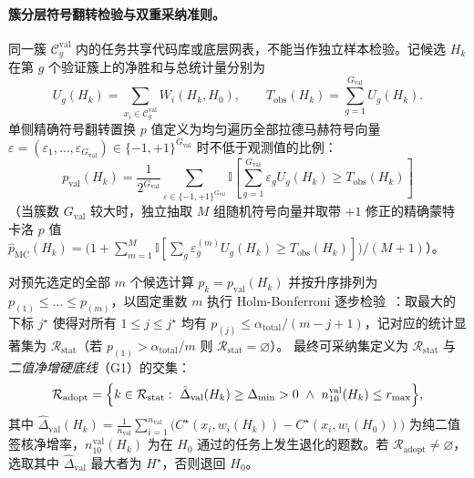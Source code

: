 \documentclass[UTF8,a4paper,10.5pt]{ctexart}
\newcommand{\Ind}{\mathbb{I}}
\begin{document}
\paragraph{簇分层符号翻转检验与双重采纳准则。}
同一簇 $\mathcal{C}^{\mathrm{val}}_g$ 内的任务共享代码库或底层网表，不能当作独立样本检验。记候选 $H_k$ 在第 $g$ 个验证簇上的净胜和与总统计量分别为
\begin{equation}
  U_g(H_k) = \sum_{x_i\in\mathcal{C}^{\mathrm{val}}_g} W_i(H_k, H_0), \qquad
  T_{\mathrm{obs}}(H_k) = \sum_{g=1}^{G_{\mathrm{val}}} U_g(H_k).
\end{equation}
单侧精确符号翻转置换 $p$ 值定义为均匀遍历全部拉德马赫符号向量 $\varepsilon=(\varepsilon_1,\dots,\varepsilon_{G_{\mathrm{val}}})\in\{-1,+1\}^{G_{\mathrm{val}}}$ 时不低于观测值的比例：
\begin{equation}
  p_{\mathrm{val}}(H_k) = \frac{1}{2^{G_{\mathrm{val}}}}
  \sum_{\varepsilon\in\{-1,+1\}^{G_{\mathrm{val}}}}
  \Ind\!\left[\sum_{g=1}^{G_{\mathrm{val}}} \varepsilon_g U_g(H_k) \ge T_{\mathrm{obs}}(H_k)\right]
  \label{eq:pval}
\end{equation}
（当簇数 $G_{\mathrm{val}}$ 较大时，独立抽取 $M$ 组随机符号向量并取带 $+1$ 修正的精确蒙特卡洛 $p$ 值 $\hat{p}_{\mathrm{MC}}(H_k)=\bigl(1+\sum_{m=1}^M\Ind[\sum_g\varepsilon^{(m)}_g U_g(H_k)\ge T_{\mathrm{obs}}(H_k)]\bigr)/(M+1)$）。

对预先选定的全部 $m$ 个候选计算 $p_k=p_{\mathrm{val}}(H_k)$ 并按升序排列为 $p_{(1)}\le\dots\le p_{(m)}$，以固定重数 $m$ 执行 Holm-Bonferroni 逐步检验~\cite{holm}：取最大的下标 $j^\star$ 使得对所有 $1\le j\le j^\star$ 均有 $p_{(j)}\le\alpha_{\mathrm{total}}/(m-j+1)$，记对应的统计显著集为 $\mathcal{R}_{\mathrm{stat}}$（若 $p_{(1)}>\alpha_{\mathrm{total}}/m$ 则 $\mathcal{R}_{\mathrm{stat}}=\varnothing$）。
最终可采纳集定义为 $\mathcal{R}_{\mathrm{stat}}$ 与\emph{二值净增硬底线}（G1）的交集：
\begin{equation}
  \mathcal{R}_{\mathrm{adopt}} = \Bigl\{k\in\mathcal{R}_{\mathrm{stat}} :\ 
  \hat{\Delta}_{\mathrm{val}}(H_k) \ge \Delta_{\min} > 0
  \ \land\ n_{10}^{\mathrm{val}}(H_k)\le r_{\max}\Bigr\},
  \label{eq:adopt}
\end{equation}
其中 $\hat{\Delta}_{\mathrm{val}}(H_k)=\frac{1}{n_{\mathrm{val}}}\sum_{i=1}^{n_{\mathrm{val}}}\bigl(C^\star(x_i,w_i(H_k))-C^\star(x_i,w_i(H_0))\bigr)$ 为纯二值签核净增率，$n_{10}^{\mathrm{val}}(H_k)$ 为在 $H_0$ 通过的任务上发生退化的题数。若 $\mathcal{R}_{\mathrm{adopt}}\neq\varnothing$，选取其中 $\hat{\Delta}_{\mathrm{val}}$ 最大者为 $H^\star$，否则退回 $H_0$。
\end{document}
